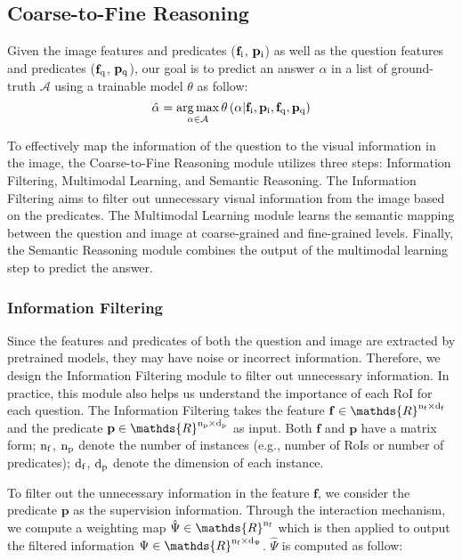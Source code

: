 \documentclass[10pt,twocolumn,letterpaper]{article}
\DeclareMathOperator*{\argmax}{arg\,max}
\begin{document}
\subsection{Coarse-to-Fine Reasoning}
\label{sec:FFOE_vQA}

Given the image features and predicates ($\mathbf{f}_{\rm i}$,  $\mathbf{p}_{\rm i}$) as well as the question features and predicates ($\mathbf{f}_{\rm q}$,  $\mathbf{p}_{\rm q}$), our goal is to predict an answer $\alpha$ in a list of ground-truth $\mathcal{A}$ using a trainable model $\theta$ as follow:
\begin{equation}
    \hat{\alpha}=\argmax_{\alpha \in \mathcal{A}} \theta\left(\alpha|\mathbf{f}_{\rm i},\mathbf{p}_{\rm i}, \mathbf{f}_{\rm q},  \mathbf{p}_{\rm q}\right)
    \label{eq:general_ffoe}
\end{equation}

To effectively map the information of the question to the visual information in the image, the Coarse-to-Fine Reasoning module utilizes three steps: Information Filtering, Multimodal Learning, and Semantic Reasoning. The  Information Filtering aims to filter out unnecessary visual information from the image based on the predicates. The Multimodal Learning module learns the semantic mapping between the question and image at coarse-grained and fine-grained levels. Finally, the Semantic Reasoning module combines the output of the multimodal learning step to predict the answer.


\subsubsection{Information Filtering}
\label{subsec:Instruc_Guiding}
Since the features and predicates of both the question and image are extracted by pretrained models, they may have noise or incorrect information. Therefore, we design the Information Filtering module to filter out unnecessary information. In practice, this module also helps us understand the importance of each RoI for each question. The Information Filtering takes the feature $\mathbf{f} \in \mathds{R}^{\rm n_f \times \rm d_f}$ and the predicate $\mathbf{p} \in \mathds{R}^{\rm n_p \times \rm d_p}$ as input.
Both $\mathbf{f}$ and $\mathbf{p}$ have a matrix form; $\rm n_f$, $\rm n_p$ denote the number of instances (e.g., number of RoIs or number of predicates); $\rm d_f$, $\rm d_p$ denote the dimension of each instance. 

To filter out the unnecessary information in the feature $\mathbf{f}$, we consider the predicate $\mathbf{p}$ as the supervision information. Through the interaction mechanism, we compute a weighting map $\hat{\Psi} \in \mathds{R}^{\rm n_f}$ which is then applied to output the filtered information $\Psi \in \mathds{R}^{\rm n_f \times \rm d_{\Psi}}$. $\hat{\Psi}$ is computed as follow:
\end{document}
